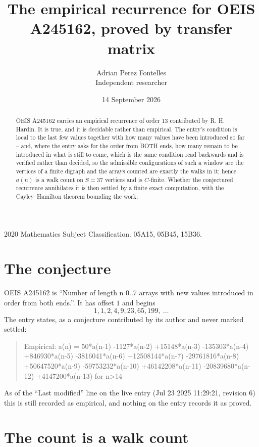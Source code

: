 \documentclass[11pt,a4paper]{article}
\title{The empirical recurrence for OEIS A245162, proved by transfer matrix}
\author{Adrian Perez Fontelles\\ \small Independent researcher}
\date{14 September 2026}
\theoremstyle{plain}
\theoremstyle{definition}
\begin{document}
\maketitle

\begin{abstract}
OEIS A245162 carries an empirical recurrence of order $13$ contributed by R. H. Hardin. It is
true, and it is decidable rather than empirical. The entry's condition is local to the last few values together with how many values have been introduced so far -- and, where the entry asks for the order from BOTH ends, how many remain to be introduced in what is still to come, which is the same condition read backwards and is verified rather than decided, so
the admissible configurations of such a window are the vertices of a finite digraph and the
arrays counted are exactly the walks in it; hence $a(n)$ is a walk count on $S=37$ vertices
and is $C$-finite. Whether the conjectured recurrence annihilates it is then settled by a
finite exact computation, with the Cayley--Hamilton theorem bounding the work.
\end{abstract}

\noindent\small 2020 Mathematics Subject Classification. 05A15, 05B45, 15B36.\normalsize

\section{The conjecture}

OEIS A245162 is ``Number of length n 0..7 arrays with new values introduced in order from both ends.''. It has offset $1$ and begins
\[
1, 1, 2, 4, 9, 23, 65, 199,\ \dots
\]
The entry states, as a conjecture contributed by its author and never marked settled:
\begin{quote}
Empirical: a(n) = 50*a(n-1) -1127*a(n-2) +15148*a(n-3) -135303*a(n-4) +846930*a(n-5) -3816041*a(n-6) +12508144*a(n-7) -29761816*a(n-8) +50647520*a(n-9) -59753232*a(n-10) +46142208*a(n-11) -20839680*a(n-12) +4147200*a(n-13) for n>14
\end{quote}
As of the ``Last modified'' line on the live entry (Jul 23 2025 11:29:21, revision 6) this is still
recorded as empirical, and nothing on the entry records it as proved.

\section{The count is a walk count}
\end{document}
